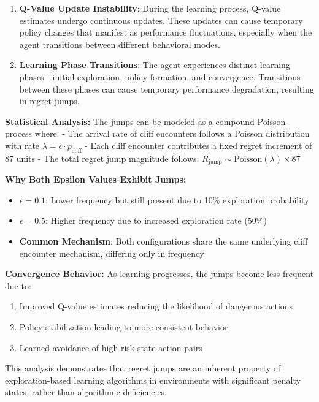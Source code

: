 \documentclass[12pt]{article}
\begin{document}
{{{\begin{enumerate}
    \item \textbf{Q-Value Update Instability}: During the learning process, Q-value estimates undergo continuous updates. These updates can cause temporary policy changes that manifest as performance fluctuations, especially when the agent transitions between different behavioral modes.
    
    \item \textbf{Learning Phase Transitions}: The agent experiences distinct learning phases - initial exploration, policy formation, and convergence. Transitions between these phases can cause temporary performance degradation, resulting in regret jumps.
\end{enumerate}

\textbf{Statistical Analysis:}
The jumps can be modeled as a compound Poisson process where:
- The arrival rate of cliff encounters follows a Poisson distribution with rate $\lambda = \epsilon \cdot p_{\text{cliff}}$
- Each cliff encounter contributes a fixed regret increment of 87 units
- The total regret jump magnitude follows: $R_{\text{jump}} \sim \text{Poisson}(\lambda) \times 87$

\textbf{Why Both Epsilon Values Exhibit Jumps:}
\begin{itemize}
    \item \textbf{$\epsilon = 0.1$}: Lower frequency but still present due to 10\% exploration probability
    \item \textbf{$\epsilon = 0.5$}: Higher frequency due to increased exploration rate (50\%)
    \item \textbf{Common Mechanism}: Both configurations share the same underlying cliff encounter mechanism, differing only in frequency
\end{itemize}

\textbf{Convergence Behavior:}
As learning progresses, the jumps become less frequent due to:
\begin{enumerate}
    \item Improved Q-value estimates reducing the likelihood of dangerous actions
    \item Policy stabilization leading to more consistent behavior
    \item Learned avoidance of high-risk state-action pairs
\end{enumerate}

This analysis demonstrates that regret jumps are an inherent property of exploration-based learning algorithms in environments with significant penalty states, rather than algorithmic deficiencies.

}}}
\end{document}
